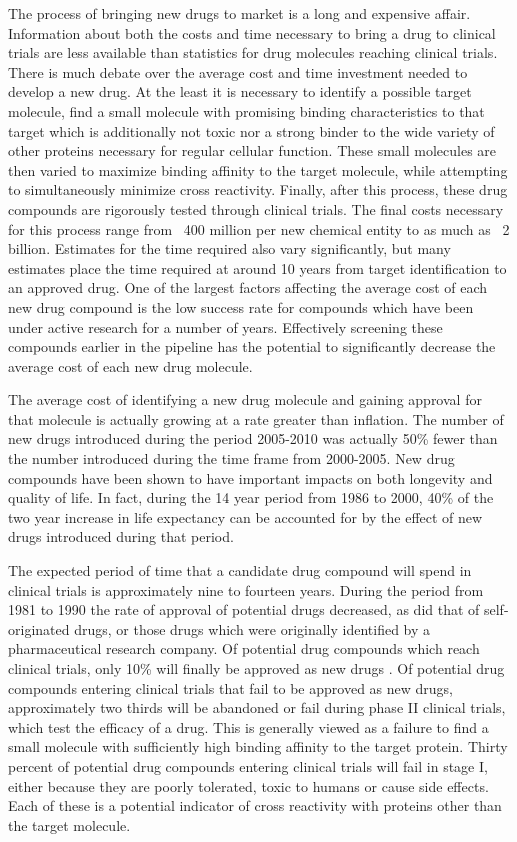 The process of bringing new drugs to market is a long and expensive affair.
Information about both the costs and time necessary to bring a drug to clinical trials are less available than statistics for drug molecules reaching clinical trials.
There is much debate over the average cost and time investment needed to develop a new drug.
At the least it is necessary to identify a possible target molecule, find a small molecule with promising binding characteristics to that target which is additionally not toxic nor a strong binder to the wide variety of other proteins necessary for regular cellular function.
These small molecules are then varied to maximize binding affinity to the target molecule, while attempting to simultaneously minimize cross reactivity.
Finally, after this process, these drug compounds are rigorously tested through clinical trials.
The final costs necessary for this process range from ~400 million per new chemical entity to as much as ~2 billion.
Estimates for the time required also vary significantly, but many estimates place the time required at around 10 years from target identification to an approved drug.
One of the largest factors affecting the average cost of each new drug compound is the low success rate for compounds which have been under active research for a number of years.
Effectively screening these compounds earlier in the pipeline has the potential to significantly decrease the average cost of each new drug molecule.
\cite{adams2006estimating}

The average cost of identifying a new drug molecule and gaining approval for that molecule is actually growing at a rate greater than inflation.
The number of new drugs introduced during the period 2005-2010 was actually 50\% fewer than the number introduced during the time frame from 2000-2005.
New drug compounds have been shown to have important impacts on both longevity and quality of life.
In fact, during the 14 year period from 1986 to 2000, 40\% of the two year increase in life expectancy can be accounted for by the effect of new drugs introduced during that period.
\cite{paul2010improve}

The expected period of time that a candidate drug compound will spend in clinical trials is approximately nine to fourteen years\cite{dimasi2003price,paul2010improve}.
During the period from 1981 to 1990 the rate of approval of potential drugs decreased, as did that of self-originated drugs, or those drugs which were originally identified by a pharmaceutical research company.
Of potential drug compounds which reach clinical trials, only 10\% will finally be approved as new drugs \cite{dimasi2001risks,paul2010improve}.
Of potential drug compounds entering clinical trials that fail to be approved as new drugs, approximately two thirds will be abandoned or fail during phase II clinical trials, which test the efficacy of a drug.
This is generally viewed as a failure to find a small molecule with sufficiently high binding affinity to the target protein.
Thirty percent of potential drug compounds entering clinical trials will fail in stage I, either because they are poorly tolerated, toxic to humans or cause side effects.
Each of these is a potential indicator of cross reactivity with proteins other than the target molecule.

